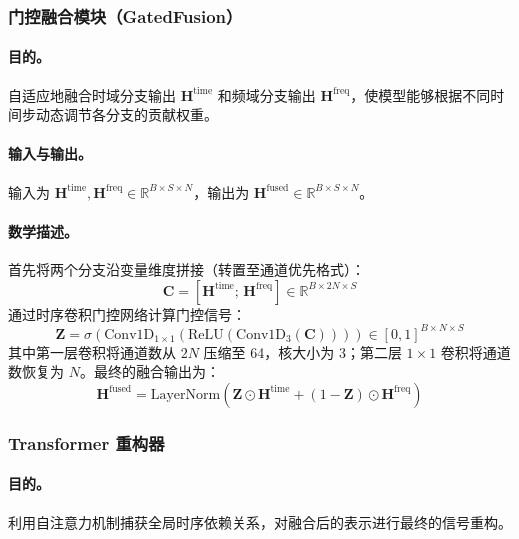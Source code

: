 \documentclass[UTF8]{ctexart}
\begin{document}
\subsubsection{门控融合模块（GatedFusion）}

\paragraph{目的。}
自适应地融合时域分支输出 $\mathbf{H}^{\text{time}}$ 和频域分支输出 $\mathbf{H}^{\text{freq}}$，使模型能够根据不同时间步动态调节各分支的贡献权重。

\paragraph{输入与输出。}
输入为 $\mathbf{H}^{\text{time}}, \mathbf{H}^{\text{freq}} \in \mathbb{R}^{B \times S \times N}$，输出为 $\mathbf{H}^{\text{fused}} \in \mathbb{R}^{B \times S \times N}$。

\paragraph{数学描述。}
首先将两个分支沿变量维度拼接（转置至通道优先格式）：
\begin{equation}
    \mathbf{C} = [\mathbf{H}^{\text{time}}; \, \mathbf{H}^{\text{freq}}] \in \mathbb{R}^{B \times 2N \times S}
\end{equation}
通过时序卷积门控网络计算门控信号：
\begin{equation}
    \mathbf{Z} = \sigma\!\left(\mathrm{Conv1D}_{1 \times 1}\!\left(\mathrm{ReLU}\!\left(\mathrm{Conv1D}_{3}\!\left(\mathbf{C}\right)\right)\right)\right) \in [0,1]^{B \times N \times S}
\end{equation}
其中第一层卷积将通道数从 $2N$ 压缩至 64，核大小为 3；第二层 $1\times 1$ 卷积将通道数恢复为 $N$。最终的融合输出为：
\begin{equation}
    \mathbf{H}^{\text{fused}} = \mathrm{LayerNorm}\!\left(\mathbf{Z} \odot \mathbf{H}^{\text{time}} + (1 - \mathbf{Z}) \odot \mathbf{H}^{\text{freq}}\right)
\end{equation}

\subsubsection{Transformer 重构器}

\paragraph{目的。}
利用自注意力机制捕获全局时序依赖关系，对融合后的表示进行最终的信号重构。
\end{document}
